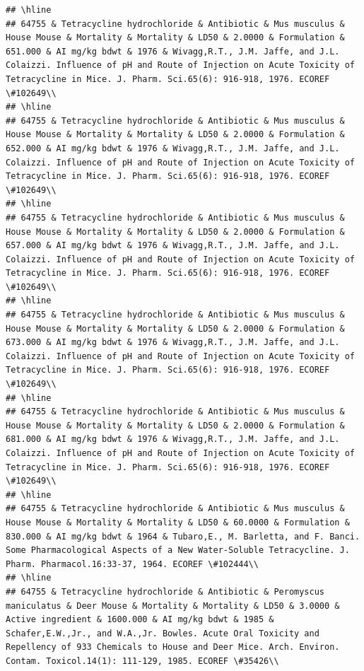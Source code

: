 \documentclass[12pt,]{article}
\begin{document}
\begin{verbatim}
## \hline
## 64755 & Tetracycline hydrochloride & Antibiotic & Mus musculus & House Mouse & Mortality & Mortality & LD50 & 2.0000 & Formulation & 651.000 & AI mg/kg bdwt & 1976 & Wivagg,R.T., J.M. Jaffe, and J.L. Colaizzi. Influence of pH and Route of Injection on Acute Toxicity of Tetracycline in Mice. J. Pharm. Sci.65(6): 916-918, 1976. ECOREF \#102649\\
## \hline
## 64755 & Tetracycline hydrochloride & Antibiotic & Mus musculus & House Mouse & Mortality & Mortality & LD50 & 2.0000 & Formulation & 652.000 & AI mg/kg bdwt & 1976 & Wivagg,R.T., J.M. Jaffe, and J.L. Colaizzi. Influence of pH and Route of Injection on Acute Toxicity of Tetracycline in Mice. J. Pharm. Sci.65(6): 916-918, 1976. ECOREF \#102649\\
## \hline
## 64755 & Tetracycline hydrochloride & Antibiotic & Mus musculus & House Mouse & Mortality & Mortality & LD50 & 2.0000 & Formulation & 657.000 & AI mg/kg bdwt & 1976 & Wivagg,R.T., J.M. Jaffe, and J.L. Colaizzi. Influence of pH and Route of Injection on Acute Toxicity of Tetracycline in Mice. J. Pharm. Sci.65(6): 916-918, 1976. ECOREF \#102649\\
## \hline
## 64755 & Tetracycline hydrochloride & Antibiotic & Mus musculus & House Mouse & Mortality & Mortality & LD50 & 2.0000 & Formulation & 673.000 & AI mg/kg bdwt & 1976 & Wivagg,R.T., J.M. Jaffe, and J.L. Colaizzi. Influence of pH and Route of Injection on Acute Toxicity of Tetracycline in Mice. J. Pharm. Sci.65(6): 916-918, 1976. ECOREF \#102649\\
## \hline
## 64755 & Tetracycline hydrochloride & Antibiotic & Mus musculus & House Mouse & Mortality & Mortality & LD50 & 2.0000 & Formulation & 681.000 & AI mg/kg bdwt & 1976 & Wivagg,R.T., J.M. Jaffe, and J.L. Colaizzi. Influence of pH and Route of Injection on Acute Toxicity of Tetracycline in Mice. J. Pharm. Sci.65(6): 916-918, 1976. ECOREF \#102649\\
## \hline
## 64755 & Tetracycline hydrochloride & Antibiotic & Mus musculus & House Mouse & Mortality & Mortality & LD50 & 60.0000 & Formulation & 830.000 & AI mg/kg bdwt & 1964 & Tubaro,E., M. Barletta, and F. Banci. Some Pharmacological Aspects of a New Water-Soluble Tetracycline. J. Pharm. Pharmacol.16:33-37, 1964. ECOREF \#102444\\
## \hline
## 64755 & Tetracycline hydrochloride & Antibiotic & Peromyscus maniculatus & Deer Mouse & Mortality & Mortality & LD50 & 3.0000 & Active ingredient & 1600.000 & AI mg/kg bdwt & 1985 & Schafer,E.W.,Jr., and W.A.,Jr. Bowles. Acute Oral Toxicity and Repellency of 933 Chemicals to House and Deer Mice. Arch. Environ. Contam. Toxicol.14(1): 111-129, 1985. ECOREF \#35426\\

\end{verbatim}
\end{document}
